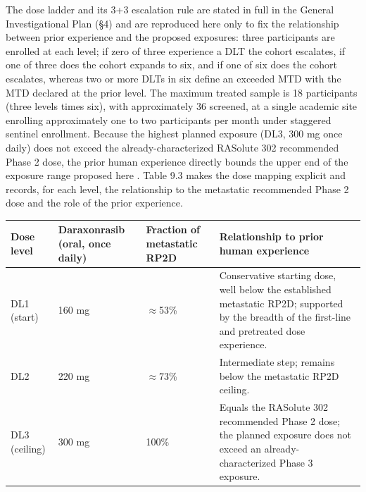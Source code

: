 The dose ladder and its 3+3 escalation rule are stated in full in the General
Investigational Plan (\S 4) and are reproduced here only to fix the relationship
between prior experience and the proposed exposures: three participants are enrolled
at each level; if zero of three experience a DLT the cohort escalates, if one of
three does the cohort expands to six, and if one of six does the cohort escalates,
whereas two or more DLTs in six define an exceeded MTD with the MTD declared at the
prior level. The maximum treated sample is 18 participants (three levels times six),
with approximately 36 screened, at a single academic site enrolling approximately
one to two participants per month under staggered sentinel enrollment. Because the
highest planned exposure (DL3, 300 mg once daily) does not exceed the
already-characterized RASolute 302 recommended Phase 2 dose, the prior human
experience directly bounds the upper end of the exposure range proposed here
\cite{daraxwhipple, phase1guidance}. Table 9.3 makes the dose mapping explicit and
records, for each level, the relationship to the metastatic recommended Phase 2
dose and the role of the prior experience.

\noindent\begin{tabularx}{\textwidth}{C{1.6cm} C{2.2cm} C{2.6cm} Y}
\toprule
\textbf{Dose level} & \textbf{Daraxonrasib (oral, once daily)} & \textbf{Fraction of metastatic RP2D} & \textbf{Relationship to prior human experience} \\
\midrule
DL1 (start) & 160 mg & $\approx$53\% & Conservative starting dose, well below the established metastatic RP2D; supported by the breadth of the first-line and pretreated dose experience. \\
DL2 & 220 mg & $\approx$73\% & Intermediate step; remains below the metastatic RP2D ceiling. \\
DL3 (ceiling) & 300 mg & 100\% & Equals the RASolute 302 recommended Phase 2 dose; the planned exposure does not exceed an already-characterized Phase 3 exposure. \\
\bottomrule
\end{tabularx}
\vspace{-0.2cm}

